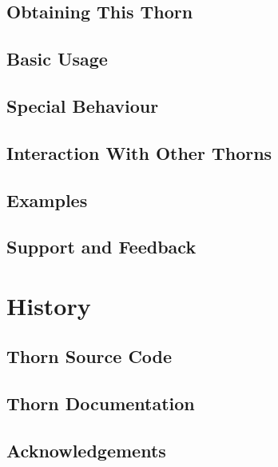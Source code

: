 \subsection{Obtaining This Thorn}

\subsection{Basic Usage}

\subsection{Special Behaviour}

\subsection{Interaction With Other Thorns}

\subsection{Examples}

\subsection{Support and Feedback}

\section{History}

\subsection{Thorn Source Code}

\subsection{Thorn Documentation}

\subsection{Acknowledgements}


